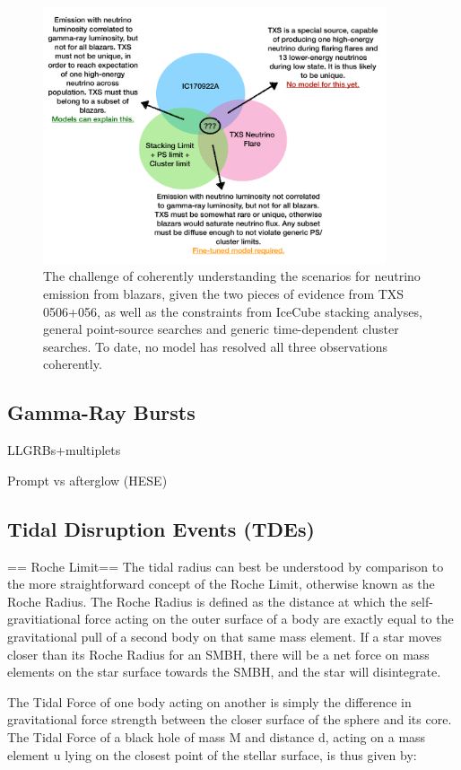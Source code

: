\documentclass[]{article}
\begin{document}
 \begin{figure}[!ht]
 	\centering \includegraphics[width=0.9\textwidth]{txs_logic}
 	\caption{The challenge of coherently understanding the scenarios for neutrino emission from blazars, given the two pieces of evidence from TXS 0506+056, as well as the constraints from IceCube stacking analyses, general point-source searches and generic time-dependent cluster searches. To date, no model has resolved all three observations coherently.}
 	\label{fig:DiscTime}
 \end{figure}
\subsection{Gamma-Ray Bursts}

LLGRBs+multiplets

Prompt vs afterglow (HESE)
\subsection{Tidal Disruption Events (TDEs)}
== Roche Limit==
The tidal radius can best be understood by comparison to the more straightforward concept of the Roche Limit, otherwise known as the Roche Radius. The Roche Radius is defined as the distance at which the self-gravitiational force acting on the outer surface of a body are exactly equal to the gravitational pull of a second body on that same mass element. If a star moves closer than its Roche Radius for an SMBH, there will be a net force on mass elements on the star surface towards the SMBH, and the star will disintegrate.

The Tidal Force of one body acting on another is simply the difference in gravitational force strength between the closer surface of the sphere and its core. The Tidal Force of a black hole of mass M and distance d, acting on a mass element u lying on the closest point of the stellar surface, is thus given by:
\end{document}
